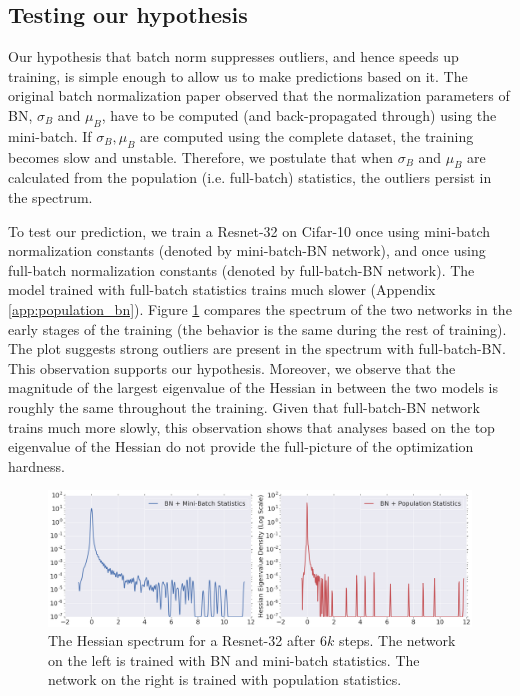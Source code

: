 \documentclass{article}
\begin{document}
\subsection{Testing our hypothesis}
\label{sec:testing_hypothesis}
Our hypothesis that batch norm suppresses outliers, and hence speeds up training, is simple enough to allow us to make predictions based on it. The original batch normalization paper \cite{ioffe2015batch} observed that the normalization parameters of BN, $\sigma_B$ and $\mu_B$, have to be computed (and back-propagated through) using the mini-batch. If $\sigma_B, \mu_B$ are computed using the complete dataset, the training becomes slow and unstable. Therefore, we postulate that when $\sigma_B$ and $\mu_B$ are calculated from the population (i.e. full-batch) statistics, the outliers persist in the spectrum. 

To test our prediction, we train a Resnet-32 on Cifar-10 once using mini-batch normalization constants (denoted by mini-batch-BN network), and once using full-batch normalization constants (denoted by full-batch-BN network). The model trained with full-batch statistics trains much slower (Appendix \ref{app:population_bn}). Figure \ref{fig:population_statistics_train} compares the spectrum of the two networks in the early stages of the training (the behavior is the same during the rest of training). The plot suggests strong outliers are present in the spectrum with full-batch-BN. This observation supports our hypothesis. Moreover, we observe that the magnitude of the largest eigenvalue of the Hessian in between the two models is roughly the same throughout the training. Given that full-batch-BN network trains much more slowly, this observation shows that analyses based on the top eigenvalue of the Hessian do not provide the full-picture of the optimization hardness. 


\begin{figure}[h]
\includegraphics[width=\textwidth]{6k_Same_Weights_Separate.png}
\vspace{-0.5cm}
\caption{The Hessian spectrum for a Resnet-32 after $6k$ steps. The network on the left is trained with BN and mini-batch statistics. The network on the right is trained with population statistics. \label{fig:population_statistics_train}}
\end{figure}
\end{document}
